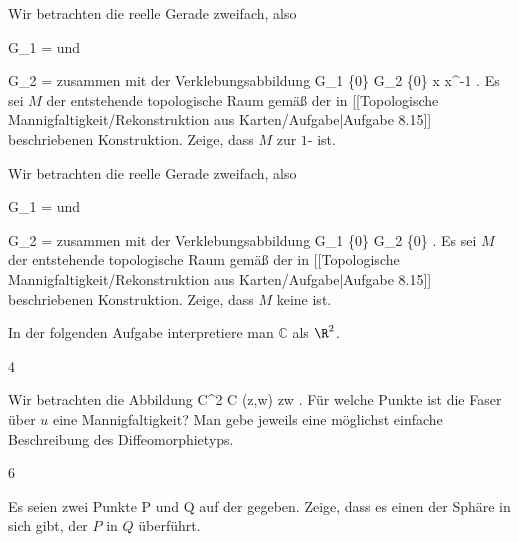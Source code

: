 {}
{

Wir betrachten die reelle Gerade zweifach, also

\mavergleichskette
{\vergleichskette
{G_1
}
{ = }{\R
}
{  }{
}
{    }{
}
{   }{
}
}
{}{}{}
und

\mavergleichskette
{\vergleichskette
{G_2
}
{ = }{\R
}
{  }{
}
{    }{
}
{   }{
}
}
{}{}{}
zusammen mit der Verklebungsabbildung
\maabbeledisp {\varphi} {G_1 \setminus \{0\} } { G_2 \setminus \{0\}
} { x } { x^{-1}
} {.}
Es sei $M$ der entstehende topologische Raum gemäß der in
[[Topologische Mannigfaltigkeit/Rekonstruktion aus Karten/Aufgabe|Aufgabe 8.15]]
beschriebenen Konstruktion. Zeige, dass $M$
zur
$1$-
ist.

}
{} {}

{}
{

Wir betrachten die reelle Gerade zweifach, also

\mavergleichskette
{\vergleichskette
{G_1
}
{ = }{\R
}
{  }{
}
{    }{
}
{   }{
}
}
{}{}{}
und

\mavergleichskette
{\vergleichskette
{G_2
}
{ = }{\R
}
{  }{
}
{    }{
}
{   }{
}
}
{}{}{}
zusammen mit der Verklebungsabbildung
 {G_1 \setminus \{0\} } { G_2 \setminus \{0\}
} {.}
Es sei $M$ der entstehende topologische Raum gemäß der in
[[Topologische Mannigfaltigkeit/Rekonstruktion aus Karten/Aufgabe|Aufgabe 8.15]]
beschriebenen Konstruktion. Zeige, dass $M$ keine
ist.

}
{} {}


In der folgenden Aufgabe interpretiere man ${\mathbb C}$ als $\R^2$.

{4}
{

Wir betrachten die Abbildung
\maabbeledisp {} { {\mathbb C}^2} { {\mathbb C}
} {(z,w)} { zw
} {.}
Für welche Punkte
 ist die Faser über $u$ eine Mannigfaltigkeit? Man gebe jeweils eine möglichst einfache Beschreibung des Diffeomorphietyps.

}
{} {}

{6}
{

Es seien zwei Punkte
\mathkor {} {P} {und} {Q} {}
auf der
gegeben. Zeige, dass es einen
der Sphäre in sich gibt, der $P$ in $Q$ überführt.

}
{} {}

